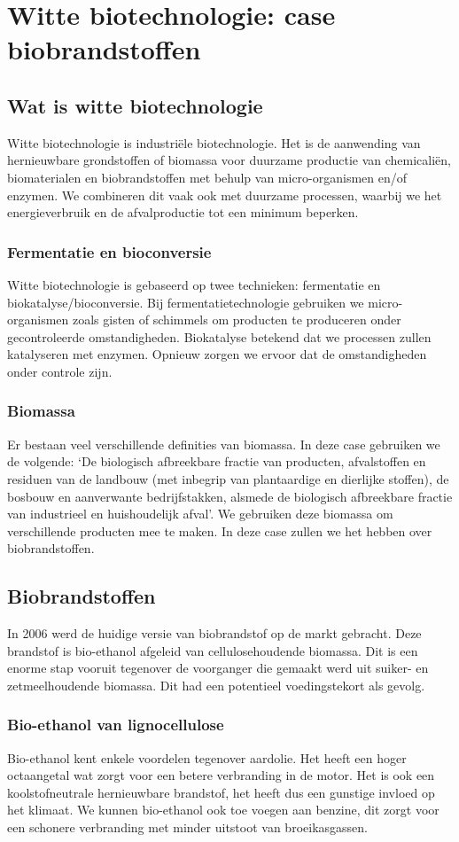 \documentclass[a4paper,kul]{kulakarticle} %
\begin{document}
\section{Witte biotechnologie: case biobrandstoffen}
\subsection{Wat is witte biotechnologie}
Witte biotechnologie is industriële biotechnologie. Het is de aanwending van hernieuwbare grondstoffen of biomassa voor duurzame productie van chemicaliën, biomaterialen en biobrandstoffen met behulp van micro-organismen en/of enzymen. We combineren dit vaak ook met duurzame processen, waarbij we het energieverbruik en de afvalproductie tot een minimum beperken. 
\subsubsection{Fermentatie en bioconversie}
Witte biotechnologie is gebaseerd op twee technieken: fermentatie en biokatalyse/bioconversie. Bij fermentatietechnologie gebruiken we micro-organismen zoals gisten of schimmels om producten te produceren onder gecontroleerde omstandigheden. Biokatalyse betekend dat we processen zullen katalyseren met enzymen. Opnieuw zorgen we ervoor dat de omstandigheden onder controle zijn. 
\subsubsection{Biomassa}
Er bestaan veel verschillende definities van biomassa. In deze case gebruiken we de volgende: `De biologisch afbreekbare fractie van producten, afvalstoffen en residuen van de landbouw (met inbegrip van plantaardige en dierlijke stoffen), de bosbouw en aanverwante bedrijfstakken, alsmede de biologisch afbreekbare fractie van industrieel en huishoudelijk afval'. We gebruiken deze biomassa om verschillende producten mee te maken. In deze case zullen we het hebben over biobrandstoffen. 
\subsection{Biobrandstoffen}
In 2006 werd de huidige versie van biobrandstof op de markt gebracht. Deze brandstof is bio-ethanol afgeleid van cellulosehoudende biomassa. Dit is een enorme stap vooruit tegenover de voorganger die gemaakt werd uit suiker- en zetmeelhoudende biomassa. Dit had een potentieel voedingstekort als gevolg. 
\subsubsection{Bio-ethanol van lignocellulose}
Bio-ethanol kent enkele voordelen tegenover aardolie. Het heeft een hoger octaangetal wat zorgt voor een betere verbranding in de motor. Het is ook een koolstofneutrale hernieuwbare brandstof, het heeft dus een gunstige invloed op het klimaat. We kunnen bio-ethanol ook toe voegen aan benzine, dit zorgt voor een schonere verbranding met minder uitstoot van broeikasgassen.
\end{document}
